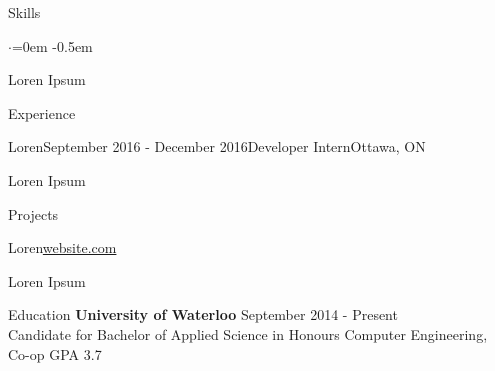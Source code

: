 \documentclass{resume} %
\begin{document}

\begin{rSection}{Skills}
  \vspace {0.5em}
  \begin{list}{$\cdot$}{\leftmargin=0em}
     \itemsep -0.5em \vspace{-0.5em}
     \item Loren Ipsum
  \end{list}
  \vspace{0.5em}
\end{rSection}


\begin{rSection}{Experience}
  \begin{rSubsection}{Loren}{September 2016 - December 2016}{Developer Intern}{Ottawa, ON}
    \item Loren Ipsum
  \end{rSubsection}
\end{rSection}



\begin{rSection}{Projects}

  \begin{rSubsection}{Loren}{\footnotesize \href{http://website.com}{website.com}}{}

    \item Loren Ipsum
  \end{rSubsection}

\end{rSection}


\begin{rSection}{Education}
  {\bf University of Waterloo} \hfill {September 2014 - Present} \\
  Candidate for Bachelor of Applied Science in
  Honours Computer Engineering, Co-op \hfill GPA 3.7
\end{rSection}
\end{document}
